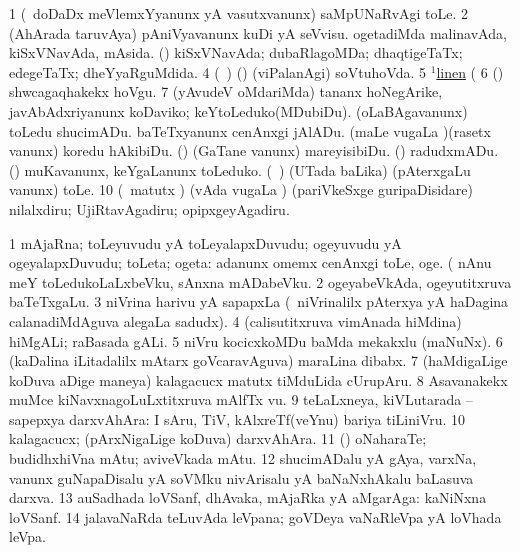 \noindent 
\gl{\pagu}
\expl{}
\bmng
\bnum
\num{1}  (\kanmu\ doDaDx meVlemxYyanunx yA vasutxvanunx) saMpUNaRvAgi toLe. 
\num{2}  (AhArada taruvAya) pAniVyavanunx kuDi yA seVvisu. 
  
\banum
{} ogetadiMda malinavAda, kiSxVNavAda, mAsida. 
 (\rUpa) kiSxVNavAda; dubaRlagoMDa; dhaqtigeTaTx; edegeTaTx; dheYyaRguMdida. 
\eanum
\numie
\num{4}  (\kanmu\ \ame) (\ashi) (viPalanAgi) soVtuhoVda. 
\num{5}  \hyperref{kandict_l.pdf}{L}{linen(1) nuga(1)}{$^1$linen}  (  
\num{6}  (\sw) shwcagaqhakekx hoVgu. 
\num{7}  (yAvudeV oMdariMda) tananx hoNegArike, javAbAdxriyanunx koDaviko; keYtoLeduko(MDubiDu). 
  
\banum
{} (oLaBAgavanunx) toLedu shucimADu. 
 baTeTxyanunx cenAnxgi jAlADu. 
 (maLe \mo vugaLa \vi)(rasetx \mo vanunx) koredu hAkibiDu. 
 (\rUpa) (GaTane \mo vanunx) mareyisibiDu. 
 (\AmA) radudxmADu. 
\eanum
\numie
{}  
\banum
{} (\ame) muKavanunx, keYgaLanunx toLeduko. 
 (\kanmu\ \birx) (UTada baLika) (pAterxgaLu \mo vanunx) toLe. 
\eanum
\numie
\num{10}  (\AmA\ matutx \rUpa) (vAda \mo vugaLa \vi) (pariVkeSxge guripaDisidare) nilalxdiru; UjiRtavAgadiru; opipxgeyAgadiru. 
\enum
\emng
\eentry

\bentry
{} 
\gl{\nA}
\expl{}
\bmng
\bnum
\num{1} mAjaRna; toLeyuvudu yA toLeyalapxDuvudu; ogeyuvudu yA ogeyalapxDuvudu; toLeta; ogeta:  adanunx omemx cenAnxgi toLe, oge.  (  nAnu meY toLedukoLaLxbeVku, sAnxna mADabeVku. 
\num{2} ogeyabeVkAda, ogeyutitxruva baTeTxgaLu. 
\num{3} niVrina harivu yA sapapxLa (\kanmu\ niVrinalilx pAterxya yA haDagina calanadiMdAguva alegaLa sadudx). 
\num{4} (calisutitxruva vimAnada hiMdina) hiMgALi; raBasada gALi. 
\num{5} niVru kocicxkoMDu baMda mekakxlu (maNuNx). 
\num{6} (kaDalina iLitadalilx mAtarx goVcaravAguva) maraLina dibabx. 
\num{7} (haMdigaLige koDuva aDige maneya) kalagacucx matutx tiMduLida cUrupAru. 
\num{8} Asavanakekx muMce kiNavxnagoLuLxtitxruva mAlfTx \mo vu. 
\num{9} teLaLxneya, kiVLutarada -- sapepxya darxvAhAra:  I sAru, TiV, kAlxreTf(veYnu) bariya tiLiniVru. 
\num{10} kalagacucx; (pArxNigaLige koDuva) darxvAhAra. 
\num{11} (\rUpa) oNaharaTe; budidhxhiVna mAtu; aviveVkada mAtu. 
\num{12} shucimADalu yA gAya, varxNa, \mo vanunx guNapaDisalu yA soVMku nivArisalu yA baNaNxhAkalu baLasuva darxva. 
\num{13} auSadhada loVSanf, dhAvaka, mAjaRka yA aMgarAga:  kaNiNxna loVSanf. 
\num{14} jalavaNaRda teLuvAda leVpana; goVDeya vaNaRleVpa yA loVhada leVpa. 
\enum
\emng

